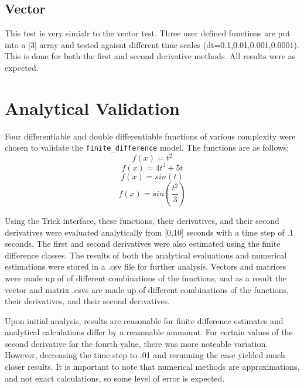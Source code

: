 \documentclass{report}
\begin{document}
\subsection{Vector}\label{subsec:verif7}
This test is very simialr to the vector test. Three user defined functions are put into a [3] array and tested agaisnt different time scales (dt=0.1,0.01,0.001,0.0001). This is done for both the first and second derivative methods.
All results were as expected.
\section{Analytical Validation}

Four differentiable and double differentiable functions of various complexity were chosen to validate the \verb|finite_difference| model. The functions are as follows:
$$ f(x) = t^2 $$
$$ f(x) = 4t^3+5t $$
$$ f(x) = sin(t) $$
$$ f(x) = sin(\frac{t^2}{3}) $$

Using the Trick interface, these functions, their derivatives, and their second derivatives were evaluated analytically from [0,10] seconds with a time step of .1 seconds. 
The first and second derivatives were also estimated using the finite difference classes. The results of both the analytical evaluations and numerical estimations were stored
in a .csv file for further analysis. Vectors and matrices were made up of of different combinations of the functions, and as a result the vector and matrix .csvs are made up of
different combinations of the functions, their derivatives, and their second derivatives.

Upon initial analysis, results are reasonable for finite difference estimates and analytical calculations differ by a reasonable ammount. For certain values of the second derivative
for the fourth value, there was more noteable variation. However, decreasing the time step to .01 and rerunning the case yielded much closer results. It is important to note that numerical
methods are approximations, and not exact calculations, so some level of error is expected.
\end{document}
